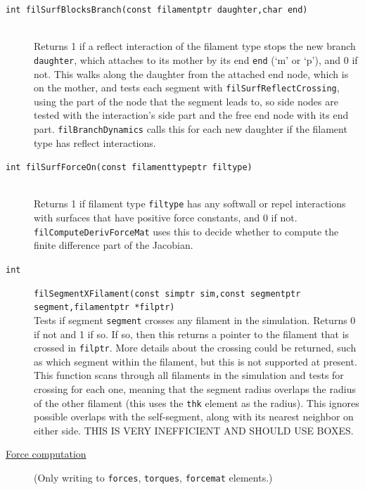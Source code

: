 \documentclass {scrbook}
\newcommand {\ttt} {\texttt}
\begin{document}
\begin{description}
\item[\ttt{int filSurfBlocksBranch(const filamentptr daughter,char end)}] %
\hfill \\
Returns 1 if a reflect interaction of the filament type stops the new branch \ttt{daughter}, which attaches to its mother by its end \ttt{end} (`m' or `p'), and 0 if not. This walks along the daughter from the attached end node, which is on the mother, and tests each segment with \ttt{filSurfReflectCrossing}, using the part of the node that the segment leads to, so side nodes are tested with the interaction's side part and the free end node with its end part. \ttt{filBranchDynamics} calls this for each new daughter if the filament type has reflect interactions.

\item[\ttt{int filSurfForceOn(const filamenttypeptr filtype)}] %
\hfill \\
Returns 1 if filament type \ttt{filtype} has any softwall or repel interactions with surfaces that have positive force constants, and 0 if not. \ttt{filComputeDerivForceMat} uses this to decide whether to compute the finite difference part of the Jacobian.

\item[\ttt{int}]
\ttt{filSegmentXFilament(const simptr sim,const segmentptr segment,filamentptr *filptr)}
\hfill \\
Tests if segment \ttt{segment} crosses any filament in the simulation. Returns 0 if not and 1 if so. If so, then this returns a pointer to the filament that is crossed in \ttt{filptr}. More details about the crossing could be returned, such as which segment within the filament, but this is not supported at present. This function scans through all filaments in the simulation and tests for crossing for each one, meaning that the segment radius overlaps the radius of the other filament (this uses the \ttt{thk} element as the radius). This ignores possible overlaps with the self-segment, along with its nearest neighbor on either side. THIS IS VERY INEFFICIENT AND SHOULD USE BOXES.

\item[\underline{Force computation}]
(Only writing to \ttt{forces}, \ttt{torques}, \ttt{forcemat} elements.)


\end{description}
\end{document}
